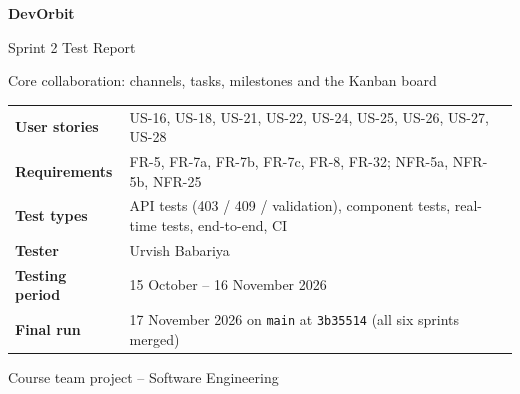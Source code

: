 \documentclass[11pt,a4paper]{article}
\begin{document}
\begin{titlepage}\centering\vspace*{2.5cm}
{\Huge\bfseries\color{accent} DevOrbit\par}\vspace{0.6cm}
{\LARGE Sprint 2 Test Report\par}\vspace{0.3cm}
{\Large Core collaboration: channels, tasks, milestones and the Kanban board\par}\vspace{1.5cm}
\begin{tabular}{>{\bfseries}l l}
User stories  & US-16, US-18, US-21, US-22, US-24, US-25, US-26, US-27, US-28 \\
Requirements  & FR-5, FR-7a, FR-7b, FR-7c, FR-8, FR-32; NFR-5a, NFR-5b, NFR-25 \\
Test types    & API tests (403 / 409 / validation), component tests, real-time tests, end-to-end, CI \\
Tester        & Urvish Babariya \\
Testing period & 15 October -- 16 November 2026 \\
Final run     & 17 November 2026 on \texttt{main} at \texttt{3b35514} (all six sprints merged) \\
\end{tabular}\vfill{\small Course team project -- Software Engineering\par}
\end{titlepage}
\tableofcontents\newpage
\end{document}

